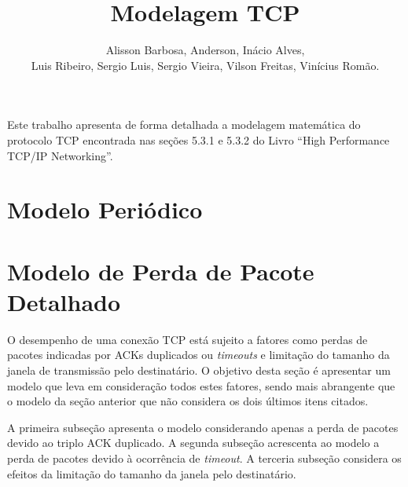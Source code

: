 \documentclass[12pt]{article}
\title{Modelagem TCP}
\author{Alisson Barbosa, Anderson, Inácio Alves, \\ 
  Luis Ribeiro, Sergio Luis, Sergio Vieira, Vilson Freitas, 
  Vinícius Romão.}
\begin{document}
 

\maketitle

     
\begin{resumo} 
  Este trabalho apresenta de forma detalhada a modelagem matemática do protocolo
  TCP encontrada nas seções 5.3.1 e 5.3.2 do Livro ``High Performance TCP/IP Networking''.
\end{resumo}


\section{Modelo Periódico}



\section{Modelo de Perda de Pacote Detalhado}
O desempenho de uma conexão TCP está sujeito a fatores como perdas de pacotes indicadas por 
ACKs duplicados ou \textit{timeouts} e limitação do tamanho da janela de transmissão pelo 
destinatário. O objetivo desta seção é apresentar um modelo que leva em consideração todos 
estes fatores, sendo mais abrangente que o modelo da seção anterior que não considera os dois
últimos itens citados.

A primeira subseção apresenta o modelo considerando apenas a perda de pacotes devido ao 
triplo ACK duplicado. A segunda subseção acrescenta ao modelo a perda de pacotes devido à
ocorrência de \textit{timeout}. A terceria subseção considera os efeitos da limitação do 
tamanho da janela pelo destinatário.



\end{document}
